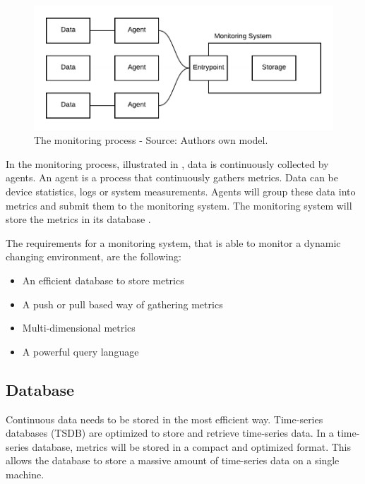 \begin{figure}[h]
\centering
\includegraphics[scale=0.9]{images/02_theoretical_foundation/monitoring/monitoring_system}
\caption{The monitoring process - Source: Authors own model.}
\label{fig:mon_mon-system-process}
\end{figure}
In the monitoring process, illustrated in , data is continuously collected by agents. An agent is a process that continuously gathers metrics. Data can be device statistics, logs or system measurements. Agents will group these data into metrics and submit them to the monitoring system. The monitoring system will store the metrics in its database \cite{Ligus2012EffMonitoring}.


The requirements for a monitoring system, that is able to monitor a dynamic changing environment, are the following:
\begin{itemize}
\item An efficient database to store metrics \cite{Farcic2017Toolkit21}
\item A push or pull based way of gathering metrics \cite{Farcic2017Toolkit21}
\item Multi-dimensional metrics \cite{Farcic2017Toolkit21}
\item A powerful query language \cite{Farcic2017Toolkit21}
\end{itemize}


\subsection{Database}
Continuous data needs to be stored in the most efficient way.
Time-series databases (TSDB) are optimized to store and retrieve time-series data.
In a time-series database, metrics will be stored in a compact and optimized format. This allows the database to store a massive amount of time-series data on a single machine.


